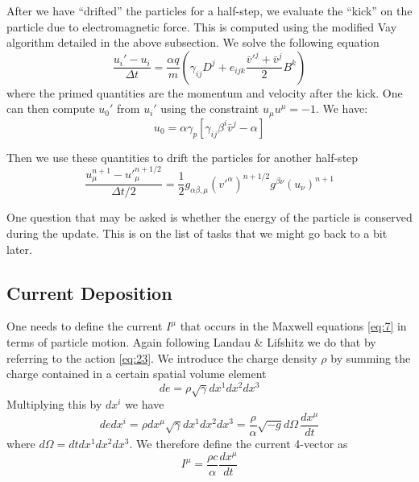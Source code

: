 After we have ``drifted'' the particles for a half-step, we evaluate the
``kick'' on the particle due to electromagnetic force. This is computed using
the modified Vay algorithm detailed in the above subsection. We solve the
following equation
\begin{equation}
  \label{eq:57}
  \frac{u_i' - u_i}{\Delta t} = \frac{\alpha q}{m}\left( \gamma_{ij}D^j + e_{ijk}\frac{\bar{v}'^j + \bar{v}^j}{2}B^k \right)
\end{equation}
where the primed quantities are the momentum and velocity after the kick. One
can then compute $u_0'$ from $u_i'$ using the constraint $u_{\mu}u^{\mu} = -1$.
We have:
\begin{equation}
  \label{eq:59}
  u_0 = \alpha\gamma_p \left[ \gamma_{ij}\beta^i\bar{v}^j - \alpha \right]
\end{equation}

Then we use these quantities to drift the particles for another half-step
\begin{equation}
  \label{eq:58}
  \frac{u_{\mu}^{n+1} - u'^{n+1/2}_{\mu}}{\Delta t/2} = \frac{1}{2}g_{\alpha\beta,\mu}(v'^{\alpha})^{n+1/2}g^{\beta\nu}(u_{\nu})^{n+1}
\end{equation}

One question that may be asked is whether the energy of the particle is conserved
during the update. This is on the list of tasks that we might go back to a bit
later.

\subsection{Current Deposition}
\label{sec:current}

One needs to define the current $I^{\mu}$ that occurs in the Maxwell equations
\eqref{eq:7} in terms of particle motion. Again following Landau \& Lifshitz we
do that by referring to the action \eqref{eq:23}. We introduce the charge
density $\rho$ by summing the charge contained in a certain spatial volume element
\begin{equation}
  \label{eq:32}
  de = \rho\sqrt{\gamma}dx^1dx^2dx^3
\end{equation}
Multiplying this by $dx^i$ we have
\begin{equation}
  de dx^i = \rho dx^\mu\sqrt{\gamma}dx^1dx^2dx^3 = \frac{\rho}{\alpha}\sqrt{-g}d\Omega\,\frac{dx^\mu}{dt}
\end{equation}
where $d\Omega = dtdx^1dx^2dx^3$. We therefore define the current 4-vector as
\begin{equation}
  \label{eq:33}
  I^{\mu} = \frac{\rho c}{\alpha}\frac{dx^{\mu}}{dt}
\end{equation}

